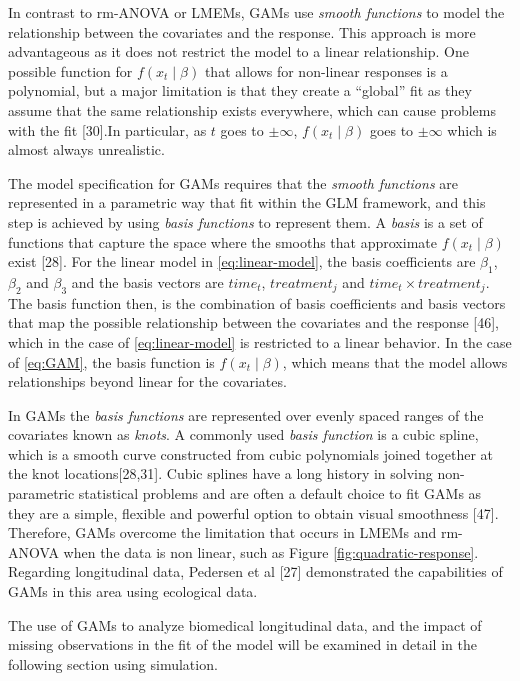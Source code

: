 \documentclass[
]{article}
\begin{document}
In contrast to rm-ANOVA or LMEMs, GAMs use \emph{smooth functions} to model the relationship between the covariates and the response. This approach is more advantageous as it does not restrict the model to a linear relationship. One possible function for \(f(x_t\mid \beta)\) that allows for non-linear responses is a polynomial, but a major limitation is that they create a ``global'' fit as they assume that the same relationship exists everywhere, which can cause problems with the fit {[}30{]}.In particular, as \(t\) goes to \(\pm \infty\), \(f(x_t \mid \beta)\) goes to \(\pm \infty\) which is almost always unrealistic.

The model specification for GAMs requires that the \emph{smooth functions} are represented in a parametric way that fit within the GLM framework, and this step is achieved by using \emph{basis functions} to represent them. A \emph{basis} is a set of functions that capture the space where the smooths that approximate \(f(x_t \mid \beta)\) exist {[}28{]}. For the linear model in \eqref{eq:linear-model}, the basis coefficients are \(\beta_1\), \(\beta_2\) and \(\beta_3\) and the basis vectors are \(time_t\), \(treatment_j\) and \(time_t \times treatment_j\). The basis function then, is the combination of basis coefficients and basis vectors that map the possible relationship between the covariates and the response {[}46{]}, which in the case of \eqref{eq:linear-model} is restricted to a linear behavior. In the case of \eqref{eq:GAM}, the basis function is \(f(x_t\mid \beta)\), which means that the model allows relationships beyond linear for the covariates.

In GAMs the \emph{basis functions} are represented over evenly spaced ranges of the covariates known as \emph{knots}. A commonly used \emph{basis function} is a cubic spline, which is a smooth curve constructed from cubic polynomials joined together at the knot locations{[}28,31{]}. Cubic splines have a long history in solving non-parametric statistical problems and are often a default choice to fit GAMs as they are a simple, flexible and powerful option to obtain visual smoothness {[}47{]}. Therefore, GAMs overcome the limitation that occurs in LMEMs and rm-ANOVA when the data is non linear, such as Figure \ref{fig:quadratic-response}. Regarding longitudinal data, Pedersen et al {[}27{]} demonstrated the capabilities of GAMs in this area using ecological data.

The use of GAMs to analyze biomedical longitudinal data, and the impact of missing observations in the fit of the model will be examined in detail in the following section using simulation.
\end{document}
